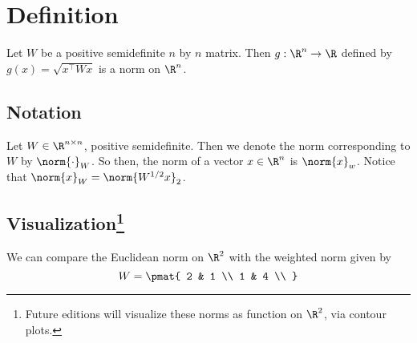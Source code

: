 
\section*{Definition}

\begin{proposition}
Let $W$ be a positive semidefinite $n$ by $n$ matrix.
Then $g: \R ^n \to \R $ defined by $g(x) = \sqrt{x^\top  W x}$ is a norm on $\R ^n$.
\end{proposition}

\subsection*{Notation}

Let $W \in \R ^{n \times n}$, positive semidefinite.
Then we denote the norm corresponding to $W$ by $\norm{\cdot }_{W}$.
So then, the norm of a vector $x \in \R ^n$ is $\norm{x}_{w}$.
Notice that $\norm{x}_{W} = \norm{W^{1/2}x}_2$.

\subsection*{Visualization\footnote{Future editions will visualize these norms as function on $\R ^2$, via contour plots.}}

We can compare the Euclidean norm on $\R ^2$ with the weighted norm given by
\[
W = \pmat{
2 & 1 \\
1 & 4 \\
}
\]


\blankpage